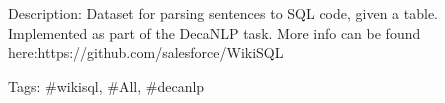 Description\+: Dataset for parsing sentences to S\+QL code, given a table. Implemented as part of the Deca\+N\+LP task. More info can be found here\+:https\+://github.com/salesforce/\+Wiki\+S\+QL

Tags\+: \#wikisql, \#\+All, \#decanlp 
